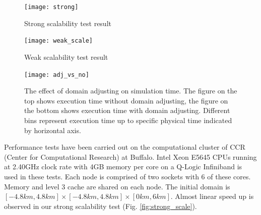 \documentclass[gmd, manuscript]{copernicus} %
\providecommand{\DIFadd}[1]{{\protect\color{blue}\uwave{#1}}} %
\providecommand{\DIFdel}[1]{{\protect\color{red}\sout{#1}}}                      %
\providecommand{\DIFaddbegin}{} %
\providecommand{\DIFaddend}{} %
\providecommand{\DIFdelbegin}{} %
\providecommand{\DIFdelend}{} %
\providecommand{\DIFaddbeginFL}{} %
\providecommand{\DIFaddendFL}{} %
\providecommand{\DIFdelbeginFL}{} %
\providecommand{\DIFdelendFL}{} %
\begin{document}
\DIFdelbegin %
\DIFdelend \DIFaddbegin \begin{figure}[!htb]
    \DIFaddendFL \centering
    \DIFdelbeginFL %
\DIFdelendFL \DIFaddbeginFL \begin{minipage}{.425\textwidth}
		\centering
		\texttt{[image: strong]}
		\DIFaddendFL \caption{Strong scalability test result}
		\label{fig:strong_scale}
    \DIFdelbeginFL %

\DIFdelendFL \DIFaddbeginFL \end{minipage}%
    \begin{minipage}{.425 \textwidth}
		\DIFaddendFL \centering
		\DIFdelbeginFL %
\DIFdelendFL \DIFaddbeginFL \texttt{[image: weak\_scale]}
		\DIFaddendFL \caption{Weak scalability test result}
		\label{fig:weak_scale}
    \DIFaddbeginFL \end{minipage}%
\DIFaddendFL \end{figure}

\begin{figure}[!t]
\centering
\texttt{[image: adj\_vs\_no]}
\caption{The effect of domain adjusting on simulation time. The figure on the top shows execution time without domain adjusting, the figure on the bottom shows execution time with domain adjusting. Different bins represent execution time up to specific physical time indicated by horizontal axis.}
\label{fig:adj_vs_no}
\end{figure}

Performance tests have been carried out on the computational cluster of CCR (Center for Computational Research) at \DIFaddbegin \DIFadd{University at }\DIFaddend Buffalo. Intel Xeon E5645 CPUs running at 2.40GHz clock rate with 4GB memory per core on a Q-Logic Infiniband is used in these tests. Each node is comprised of two sockets with 6 of these cores. Memory and level 3 cache are shared on each node. The initial domain is \DIFdelbegin \DIFdel{$[-4.8km,4.8km] \times [-4.8km,4.8km] \times [0km, 6km]$}\DIFdelend \DIFaddbegin \DIFadd{$[-4.8km, 4.8km] \times [-4.8km,4.8km] \times [0km, 6km]$}\DIFaddend . Almost linear speed up is observed in our strong scalability test (Fig. \ref{fig:strong_scale}).
\end{document}
